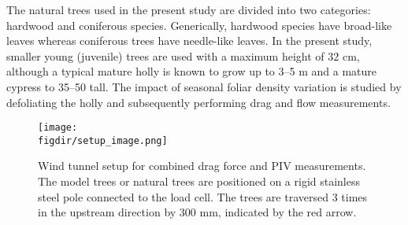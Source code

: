 
The natural trees used in the present study are divided into two categories: hardwood and coniferous species. Generically, hardwood species have broad-like leaves whereas coniferous trees have needle-like leaves. In the present study, smaller young (juvenile) trees are used with a maximum height of $32$ cm, although a typical mature holly is known to grow up to \numrange{3}{5} m and a mature cypress to \numrange{35}{50} tall. The impact of seasonal foliar density variation is studied by defoliating the holly and subsequently performing drag and flow measurements.

	\begin{figure}[t]
	\centering
	\texttt{[image: \\figdir/setup\_image.png]}
	\caption{Wind tunnel setup for combined drag force and PIV measurements. The model trees or natural trees are positioned on a rigid stainless steel pole connected to the load cell. The trees are traversed 3 times in the upstream direction by $300$ mm, indicated by the red arrow.}
	\label{fig:setupimage}
	\end{figure}

